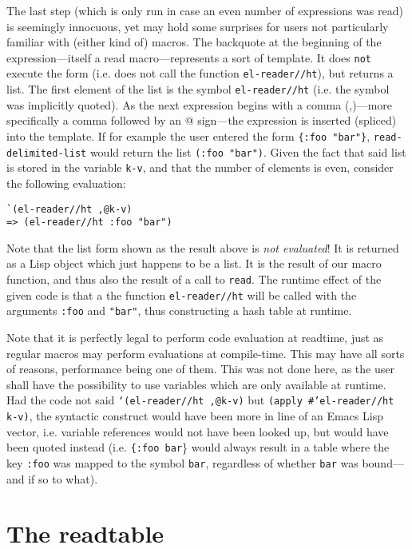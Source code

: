 \documentclass[a4paper,10pt,twoside]{report}
\newcommand{\el}{Emacs Lisp}
\newcommand{\sym}[1]{\texttt{#1}}
\newcommand{\fun}[1]{\texttt{#1}}
\newcommand{\Read}{\fun{read}}
\begin{document}
The last step (which is only run in case an even number of expressions was read)
is seemingly innocuous, yet may hold some surprises for users not particularly
familiar with (either kind of) macros.  The backquote at the beginning of the
expression---itself a read macro---represents a sort of template.  It does
\texttt{not} execute the form (i.e. does not call the function
\fun{el-reader//ht}), but returns a list.  The first element of the list is the
symbol \sym{el-reader//ht} (i.e. the symbol was implicitly quoted).  As the next
expression begins with a comma (,)---more specifically a comma followed by an @
sign---the expression is inserted (spliced) into the template.  If for example
the user entered the form \texttt{\{:foo "bar"\}}, \fun{read-delimited-list} would
return the list \texttt{(:foo "bar")}.  Given the fact that said list is stored
in the variable \sym{k-v}, and that the number of elements is even, consider the
following evaluation:

\begin{lstlisting}[style=lispinline]
`(el-reader//ht ,@k-v)
=> (el-reader//ht :foo "bar")
\end{lstlisting}

Note that the list form shown as the result above is \emph{not evaluated}!  It
is returned as a Lisp object which just happens to be a list.  It is the result
of our macro function, and thus also the result of a call to \Read{}.  The
runtime effect of the given code is that a the function \fun{el-reader//ht} will
be called with the arguments \texttt{:foo} and \texttt{"bar"}, thus constructing
a hash table at runtime.

Note that it is perfectly legal to perform code evaluation at readtime, just as
regular macros may perform evaluations at compile-time.  This may have all sorts
of reasons, performance being one of them.  This was not done here, as the user
shall have the possibility to use variables which are only available at
runtime.  Had the code not said \texttt{`(el-reader//ht ,@k-v)} but
\texttt{(apply \#'el-reader//ht k-v)}, the syntactic construct would have been
more in line of an \el{} vector, i.e. variable references would not have been
looked up, but would have been quoted instead (i.e. \texttt{\{:foo bar}\} would
always result in a table where the key \sym{:foo} was mapped to the symbol
\sym{bar}, regardless of whether \sym{bar} was bound---and if so to what).

\section{The readtable}
\label{subsec:readtable}
\end{document}
